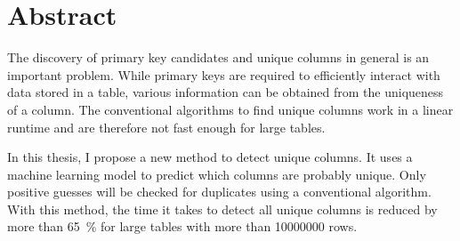 \begingroup
\let\clearpage\relax
\let\cleardoublepage\relax
\let\cleardoublepage\relax
\chapter*{Abstract}
The discovery of primary key candidates and unique columns in general is an important problem. While primary keys are required to efficiently interact with data stored in a table, various information can be obtained from the uniqueness of a column. %
The conventional algorithms to find unique columns work in a linear runtime and are therefore not fast enough for large tables.

In this thesis, I propose a new method to detect unique columns. It uses a machine learning model to predict which columns are probably unique. Only positive guesses will be checked for duplicates using a conventional algorithm. With this method, the time it takes to detect all unique columns is reduced by more than \SI{65}{\percent} for large tables with more than \num{10000000} rows. %


\endgroup

